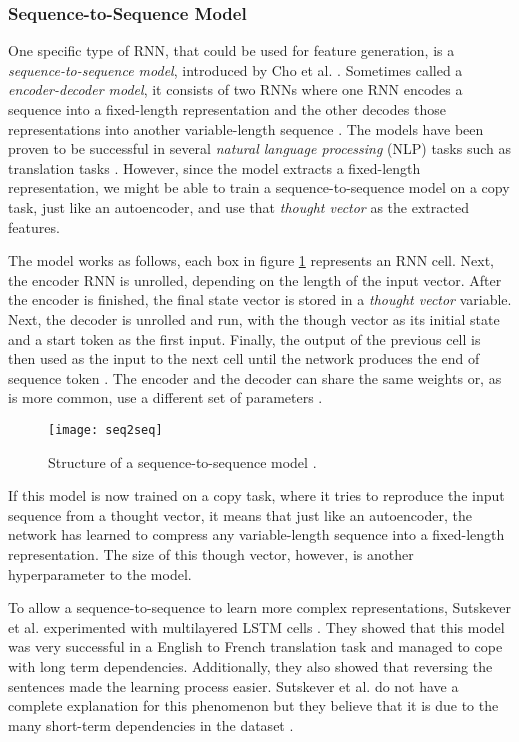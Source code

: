\subsubsection{Sequence-to-Sequence Model}

One specific type of RNN, that could be used for feature generation, is a \textit{sequence-to-sequence model}, introduced by Cho et al. \cite{cho2014learning}.
Sometimes called a \textit{encoder-decoder model}, it consists of two RNNs where one RNN encodes a sequence into a fixed-length representation and the other decodes those representations into another variable-length sequence \cite{cho2014learning}.
The models have been proven to be successful in several \textit{natural language processing} (NLP) tasks such as translation tasks \cite{cho2014learning,sutskever_vinyals_le,tensorflowseq2seq}.
However, since the model extracts a fixed-length representation, we might be able to train a sequence-to-sequence model on a copy task, just like an autoencoder, and use that \textit{thought vector} as the extracted features.

The model works as follows, each box in figure \ref{fig:seq2seq} represents an RNN cell. Next, the encoder RNN is unrolled, depending on the length of the input vector.
After the encoder is finished, the final state vector is stored in a \textit{thought vector} variable.
Next, the decoder is unrolled and run, with the though vector as its initial state and a start token as the first input.
Finally, the output of the previous cell is then used as the input to the next cell until the network produces the end of sequence token \cite{cho2014learning}.
The encoder and the decoder can share the same weights or, as is more common, use a different set of parameters \cite{tensorflowseq2seq}.

\begin{figure}[ht]
  \centering
  \texttt{[image: seq2seq]}
  \caption{Structure of a sequence-to-sequence model \cite{britz_2016_1}.}
  \label{fig:seq2seq}
\end{figure}

If this model is now trained on a copy task, where it tries to reproduce the input sequence from a thought vector, it means that just like an autoencoder,
the network has learned to compress any variable-length sequence into a fixed-length representation.
The size of this though vector, however, is another hyperparameter to the model.

To allow a sequence-to-sequence to learn more complex representations, Sutskever et al. experimented with multilayered LSTM cells \cite{sutskever_vinyals_le}.
They showed that this model was very successful in a English to French translation task and managed to cope with long term dependencies.
Additionally, they also showed that reversing the sentences made the learning process easier.
Sutskever et al. do not have a complete explanation for this phenomenon but they believe that it is due to the many short-term dependencies in the dataset \cite{sutskever_vinyals_le}.


